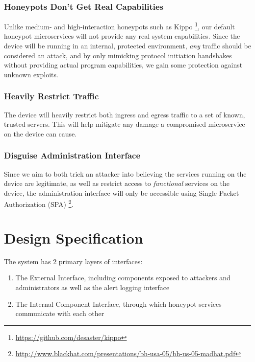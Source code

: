 \subsubsection{Honeypots Don't Get Real Capabilities}

Unlike medium- and high-interaction honeypots such as Kippo
\footnote{\url{https://github.com/desaster/kippo}}, our default honeypot
microservices will not provide any real system capabilities. Since the device will be
running in an internal, protected environment, \textit{any} traffic should
be considered an attack, and by only mimicking protocol initiation handshakes
without providing actual program capabilities, we gain some protection
against unknown exploits.

\subsubsection{Heavily Restrict Traffic}

The device will heavily restrict both ingress and egress traffic to a set of
known, trusted servers. This will help mitigate any damage a compromised
microservice on the device can cause.

\subsubsection{Disguise Administration Interface}

Since we aim to both trick an attacker into believing the services running
on the device are legitimate, as well as restrict access to \textit{functional}
services on the device, the administration interface will only be
accessible using Single Packet Authorization (SPA) 
\footnote{\url{http://www.blackhat.com/presentations/bh-usa-05/bh-us-05-madhat.pdf}}.

\section{Design Specification}

The system has 2 primary layers of interfaces:

\begin{enumerate}
    \item The External Interface, including components exposed to attackers and administrators as well as the alert logging interface
    \item The Internal Component Interface, through which honeypot services communicate with each other
\end{enumerate}


